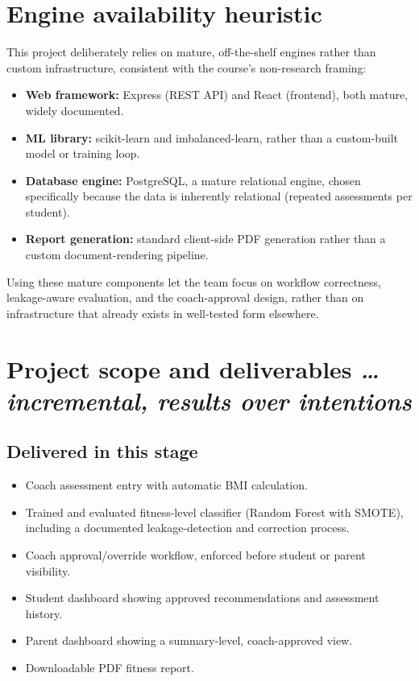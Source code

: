 \documentclass[11pt,a4paper]{article}
\newcommand{\BvrHint}[1]{%
  {\normalfont\normalsize\itshape\hfill #1}}
\begin{document}
\section{Engine availability heuristic}
This project deliberately relies on mature, off-the-shelf
engines rather than custom infrastructure, consistent with
the course's non-research framing:
\begin{itemize}[leftmargin=0.7cm]
    \item \textbf{Web framework:} Express (REST API) and React (frontend), both mature, widely documented.
    \item \textbf{ML library:} scikit-learn and imbalanced-learn, rather than a custom-built model or training loop.
    \item \textbf{Database engine:} PostgreSQL, a mature relational engine, chosen specifically because the data is inherently relational (repeated assessments per student).
    \item \textbf{Report generation:} standard client-side PDF generation rather than a custom document-rendering pipeline.
\end{itemize}
Using these mature components let the team focus on
workflow correctness, leakage-aware evaluation, and the
coach-approval design, rather than on infrastructure that
already exists in well-tested form elsewhere.

\section{Project scope and deliverables %
\BvrHint{\ldots incremental, results over intentions}}
\label{sec:deliverables}

\subsection{Delivered in this stage}
\begin{itemize}[leftmargin=0.7cm]
    \item Coach assessment entry with automatic BMI calculation.
    \item Trained and evaluated fitness-level classifier (Random Forest with SMOTE), including a documented leakage-detection and correction process.
    \item Coach approval/override workflow, enforced before student or parent visibility.
    \item Student dashboard showing approved recommendations and assessment history.
    \item Parent dashboard showing a summary-level, coach-approved view.
    \item Downloadable PDF fitness report.
\end{itemize}
\end{document}
